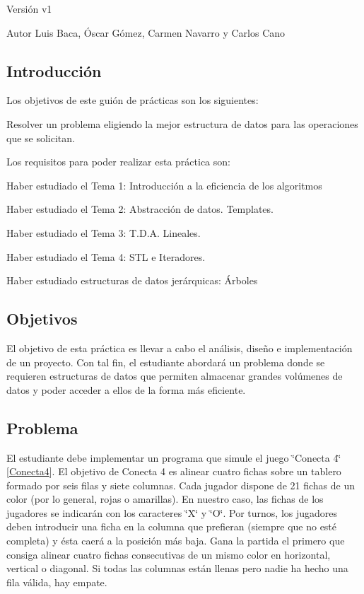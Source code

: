 \begin{DoxyVersion}{Versión}
v1 
\end{DoxyVersion}
\begin{DoxyAuthor}{Autor}
Luis Baca, Óscar Gómez, Carmen Navarro y Carlos Cano
\end{DoxyAuthor}
\hypertarget{index_introduccion}{}\subsection{Introducción}\label{index_introduccion}
Los objetivos de este guión de prácticas son los siguientes\+:
\begin{DoxyItemize}
\item Resolver un problema eligiendo la mejor estructura de datos para las operaciones que se solicitan.
\end{DoxyItemize}

Los requisitos para poder realizar esta práctica son\+:
\begin{DoxyEnumerate}
\item Haber estudiado el Tema 1\+: Introducción a la eficiencia de los algoritmos
\item Haber estudiado el Tema 2\+: Abstracción de datos. Templates.
\item Haber estudiado el Tema 3\+: T.\+D.\+A. Lineales.
\item Haber estudiado el Tema 4\+: S\+TL e Iteradores.
\item Haber estudiado estructuras de datos jerárquicas\+: Árboles
\end{DoxyEnumerate}\hypertarget{index_objetivos}{}\subsection{Objetivos}\label{index_objetivos}
El objetivo de esta práctica es llevar a cabo el análisis, diseño e implementación de un proyecto. Con tal fin, el estudiante abordará un problema donde se requieren estructuras de datos que permiten almacenar grandes volúmenes de datos y poder acceder a ellos de la forma más eficiente.\hypertarget{index_problema}{}\subsection{Problema}\label{index_problema}
El estudiante debe implementar un programa que simule el juego \char`\"{}\+Conecta 4\char`\"{} \mbox{[}\hyperlink{classConecta4}{Conecta4}\mbox{]}. El objetivo de Conecta 4 es alinear cuatro fichas sobre un tablero formado por seis filas y siete columnas. Cada jugador dispone de 21 fichas de un color (por lo general, rojas o amarillas). En nuestro caso, las fichas de los jugadores se indicarán con los caracteres \char`\"{}\+X\char`\"{} y \char`\"{}\+O\char`\"{}. Por turnos, los jugadores deben introducir una ficha en la columna que prefieran (siempre que no esté completa) y ésta caerá a la posición más baja. Gana la partida el primero que consiga alinear cuatro fichas consecutivas de un mismo color en horizontal, vertical o diagonal. Si todas las columnas están llenas pero nadie ha hecho una fila válida, hay empate.

